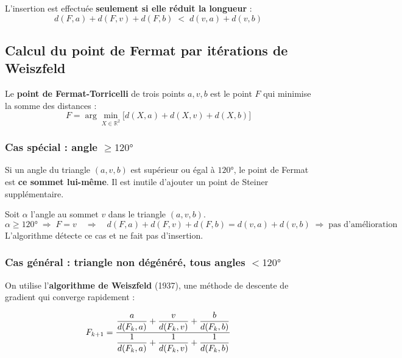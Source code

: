 \documentclass[12pt,a4paper]{article}
\begin{document}
L'insertion est effectuée \textbf{seulement si elle réduit la longueur} :
\begin{equation}
  d(F,a) + d(F,v) + d(F,b) \;<\; d(v,a) + d(v,b)
  \label{eq:condition}
\end{equation}

\subsection{Calcul du point de Fermat par itérations de Weiszfeld}

Le \textbf{point de Fermat-Torricelli} de trois points $a, v, b$ est le point $F$
qui minimise la somme des distances :
\begin{equation}
  F = \arg\min_{X \in \mathbb{R}^2} \bigl[d(X,a) + d(X,v) + d(X,b)\bigr]
\end{equation}

\subsubsection*{Cas spécial : angle $\geq 120°$}

Si un angle du triangle $(a, v, b)$ est supérieur ou égal à $120°$,
le point de Fermat est \textbf{ce sommet lui-même}.
Il est inutile d'ajouter un point de Steiner supplémentaire.

\begin{tcolorbox}[defbox={Règle des $120°$}]
Soit $\alpha$ l'angle au sommet $v$ dans le triangle $(a, v, b)$.
\[
  \alpha \geq 120° \;\Longrightarrow\; F = v
  \quad\Longrightarrow\quad
  d(F,a)+d(F,v)+d(F,b) = d(v,a)+d(v,b) \;\Longrightarrow\; \text{pas d'amélioration}
\]
L'algorithme détecte ce cas et ne fait pas d'insertion.
\end{tcolorbox}

\subsubsection*{Cas général : triangle non dégénéré, tous angles $< 120°$}

On utilise l'\textbf{algorithme de Weiszfeld} (1937), une méthode de
descente de gradient qui converge rapidement :

\begin{equation}
  F_{k+1} = \frac{%
    \dfrac{a}{d(F_k, a)} + \dfrac{v}{d(F_k, v)} + \dfrac{b}{d(F_k, b)}
  }{%
    \dfrac{1}{d(F_k, a)} + \dfrac{1}{d(F_k, v)} + \dfrac{1}{d(F_k, b)}
  }
  \label{eq:weiszfeld}
\end{equation}
\end{document}
